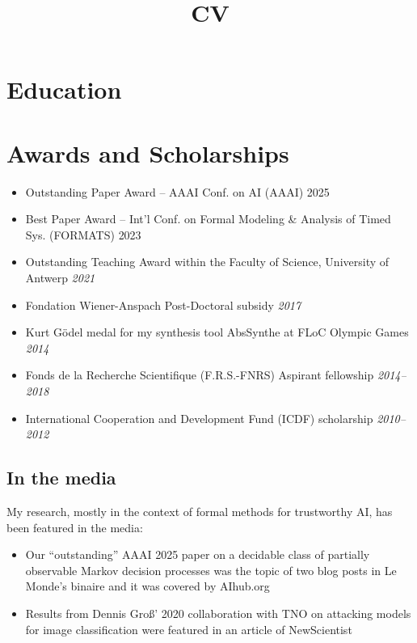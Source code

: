 \documentclass[10pt,a4paper]{moderncv}
\title{CV}
\begin{document}
\makecvtitle

\section{Education}

\section{Awards and Scholarships}
\begin{itemize}
  \item Outstanding Paper Award -- AAAI Conf. on AI (AAAI) \hfill{2025}
  \item Best Paper Award -- Int'l Conf. on Formal Modeling
    \& Analysis of Timed Sys. (FORMATS) \hfill{2023}
  \item Outstanding Teaching Award within the Faculty of Science, University
    of Antwerp \hfill \textit{2021}
	\item Fondation Wiener-Anspach Post-Doctoral subsidy \hfill
		\textit{2017}
  \item Kurt G\"odel medal for my synthesis tool AbsSynthe at FLoC Olympic
    Games \hfill \textit{2014}
	\item Fonds de la Recherche Scientifique (F.R.S.-FNRS) Aspirant
		fellowship \hfill \textit{2014--2018}
  \item International Cooperation and Development Fund (ICDF) scholarship
    \hfill \textit{2010--2012}
\end{itemize}

\subsection{In the media}
My research, mostly in the context of formal methods for trustworthy AI, has
been featured in the media:
\begin{itemize}
  \item Our ``outstanding'' AAAI 2025 paper on a decidable class of partially
    observable Markov decision processes was the topic of two blog posts in Le
    Monde’s binaire and it was covered by AIhub.org
  \item Results from Dennis Groß’ 2020 collaboration with TNO on attacking models
    for image classification were featured in an article of NewScientist
\end{itemize}
\end{document}
